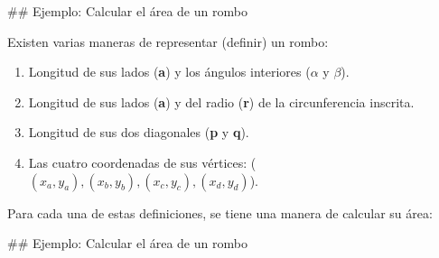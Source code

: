 ## Ejemplo: Calcular el área de un rombo

Existen varias maneras de representar (definir) un rombo:
\begin{enumerate}
    \footnotesize
    \item Longitud de sus lados (\textbf{a}) y los ángulos interiores ($\alpha$ y $\beta$).
    \item Longitud de sus lados (\textbf{a}) y del radio (\textbf{r}) de la circunferencia inscrita.
    \item Longitud de sus dos diagonales (\textbf{p} y \textbf{q}).
    \item \alert<2->{Las cuatro coordenadas de sus vértices: (\textbf{$ (x_a, y_a), (x_b, y_b), (x_c, y_c), (x_d, y_d)$}).}
\end{enumerate}

\vspace{4mm}
Para cada una de estas definiciones, se tiene una manera de calcular su área:

## Ejemplo: Calcular el área de un rombo

\vspace*{-12mm}

\bgncolumns

